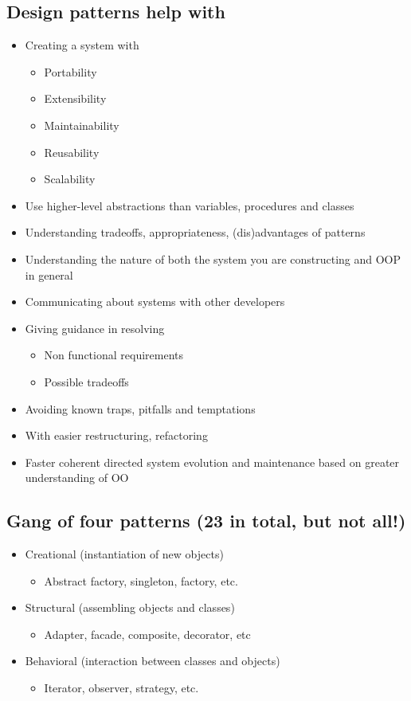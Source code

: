 \documentclass[12pt]{book}
\begin{document}
\subsection{Design patterns help with}
\begin{itemize}
  \item Creating a system with
  \begin{itemize}
    \item Portability
    \item Extensibility
    \item Maintainability
    \item Reusability
    \item Scalability
  \end{itemize} 

  \item Use higher-level abstractions than variables, procedures and classes
  \item Understanding tradeoffs, appropriateness, (dis)advantages of patterns 
  \item Understanding the nature of both the system you are constructing and OOP in general
  \item Communicating about systems with other developers
  \item Giving guidance in resolving
  \begin{itemize}
    \item Non functional requirements
    \item Possible tradeoffs
  \end{itemize} 

  \item Avoiding known traps, pitfalls and temptations
  \item With easier restructuring, refactoring
  \item Faster coherent directed system evolution and maintenance based on greater understanding of OO
\end{itemize}

\subsection{Gang of four patterns (23 in total, but not all!)}

\begin{itemize}
  \item Creational (instantiation of new objects)
  \begin{itemize}
    \item Abstract factory, singleton, factory, etc.
  \end{itemize} 
  \item Structural (assembling objects and classes)
  \begin{itemize}
    \item Adapter, facade, composite, decorator, etc
  \end{itemize} 
  \item Behavioral (interaction between classes and objects)
  \begin{itemize}
    \item Iterator, observer, strategy, etc.
  \end{itemize} 
\end{itemize}
\end{document}
